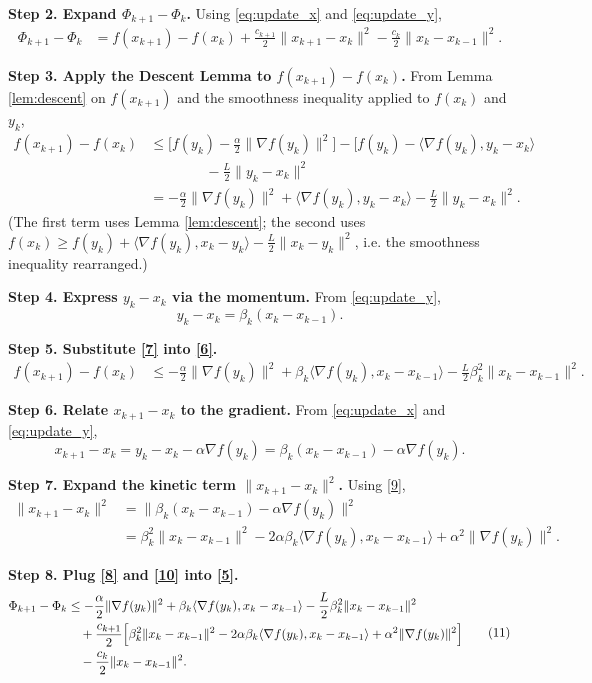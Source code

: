 \documentclass{article}
\newcommand{\grad}{\nabla}
\begin{document}
\noindent\textbf{Step 2. Expand $\Phi_{k+1}-\Phi_k$.}  
Using \eqref{eq:update_x} and \eqref{eq:update_y},
\[
\begin{aligned}
\Phi_{k+1}-\Phi_k
&= f(x_{k+1})-f(x_k)+\frac{c_{k+1}}{2}\|x_{k+1}-x_k\|^2-\frac{c_k}{2}\|x_k-x_{k-1}\|^2 .
\end{aligned}
\tag{5}
\]

\noindent\textbf{Step 3. Apply the Descent Lemma to $f(x_{k+1})-f(x_k)$.}  
From Lemma \ref{lem:descent} on $f(x_{k+1})$ and the smoothness inequality applied to $f(x_k)$ and $y_k$,
\[
\begin{aligned}
f(x_{k+1})-f(x_k)
&\le \bigl[f(y_k)-\tfrac{\alpha}{2}\|\grad f(y_k)\|^2\bigr]-\bigl[f(y_k)-\langle\grad f(y_k),y_k-x_k\rangle\\
&\qquad\qquad -\frac{L}{2}\|y_k-x_k\|^2 \\
&= -\frac{\alpha}{2}\|\grad f(y_k)\|^2+\langle\grad f(y_k),y_k-x_k\rangle-\frac{L}{2}\|y_k-x_k\|^2 .
\end{aligned}
\tag{6}
\]
(The first term uses Lemma \ref{lem:descent}; the second uses $f(x_k)\ge f(y_k)+\langle\grad f(y_k),x_k-y_k\rangle-\frac{L}{2}\|x_k-y_k\|^2$, i.e. the smoothness inequality rearranged.)

\noindent\textbf{Step 4. Express $y_k-x_k$ via the momentum.}  
From \eqref{eq:update_y},
\[
y_k-x_k = \beta_k (x_k-x_{k-1}). \tag{7}
\]

\noindent\textbf{Step 5. Substitute \eqref{7} into \eqref{6}.}  
\[
\begin{aligned}
f(x_{k+1})-f(x_k)
&\le -\frac{\alpha}{2}\|\grad f(y_k)\|^2+\beta_k\langle\grad f(y_k),x_k-x_{k-1}\rangle-\frac{L}{2}\beta_k^{2}\|x_k-x_{k-1}\|^2 .
\end{aligned}
\tag{8}
\]

\noindent\textbf{Step 6. Relate $x_{k+1}-x_k$ to the gradient.}  
From \eqref{eq:update_x} and \eqref{eq:update_y},
\[
x_{k+1}-x_k = y_k-x_k-\alpha\grad f(y_k)=\beta_k (x_k-x_{k-1})-\alpha\grad f(y_k). \tag{9}
\]

\noindent\textbf{Step 7. Expand the kinetic term $\|x_{k+1}-x_k\|^2$.}  
Using \eqref{9},
\[
\begin{aligned}
\|x_{k+1}-x_k\|^2
&= \|\beta_k (x_k-x_{k-1})-\alpha\grad f(y_k)\|^2\\
&= \beta_k^{2}\|x_k-x_{k-1}\|^2
   -2\alpha\beta_k\langle\grad f(y_k),x_k-x_{k-1}\rangle
   +\alpha^{2}\|\grad f(y_k)\|^2 .
\end{aligned}
\tag{10}
\]

\noindent\textbf{Step 8. Plug \eqref{8} and \eqref{10} into \eqref{5}.}  
\[
\begin{aligned}
\Phi_{k+1}-\Phi_k
&\le -\frac{\alpha}{2}\|\grad f(y_k)\|^2
   +\beta_k\langle\grad f(y_k),x_k-x_{k-1}\rangle
   -\frac{L}{2}\beta_k^{2}\|x_k-x_{k-1}\|^2 \\
&\quad +\frac{c_{k+1}}{2}\Bigl[\beta_k^{2}\|x_k-x_{k-1}\|^2
   -2\alpha\beta_k\langle\grad f(y_k),x_k-x_{k-1}\rangle
   +\alpha^{2}\|\grad f(y_k)\|^2\Bigr] \\
&\quad -\frac{c_k}{2}\|x_k-x_{k-1}\|^2 .
\end{aligned}
\tag{11}
\]
\end{document}
